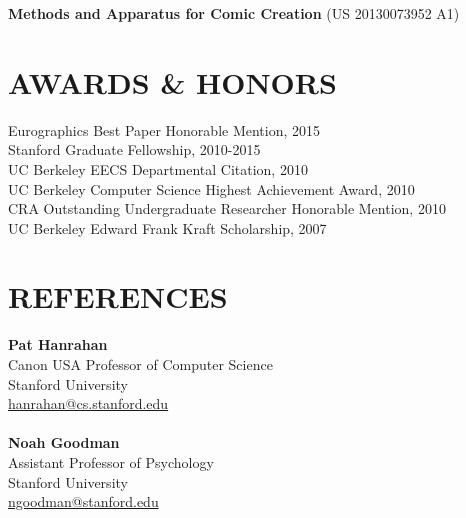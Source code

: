 \documentclass[line,margin]{res}
\begin{document}
\begin{resume}
\textbf{Methods and Apparatus for Comic Creation} (US 20130073952 A1)

\section{AWARDS \& HONORS}
Eurographics Best Paper Honorable Mention, 2015 \\
Stanford Graduate Fellowship, 2010-2015 \\ 
UC Berkeley EECS Departmental Citation, 2010 \\
UC Berkeley Computer Science Highest Achievement Award, 2010 \\
CRA Outstanding Undergraduate Researcher Honorable Mention, 2010 \\
UC Berkeley Edward Frank Kraft Scholarship, 2007 \\


\section{REFERENCES}

\textbf{Pat Hanrahan} \\
Canon USA Professor of Computer Science \\
Stanford University  \\
\url{hanrahan@cs.stanford.edu}
\\ \\
\textbf{Noah Goodman} \\
Assistant Professor of Psychology \\
Stanford University  \\
\url{ngoodman@stanford.edu}

\end{resume}
\end{document}
